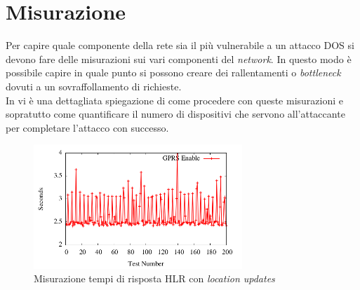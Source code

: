 \clearpage

\section{Misurazione}
Per capire quale componente della rete sia il più vulnerabile a un attacco DOS si devono fare delle misurazioni sui vari componenti del \textit{network}.
In questo modo è possibile capire in quale punto si possono creare dei rallentamenti o \textit{bottleneck} dovuti a un sovraffollamento di richieste.\\
In \cite{measuring-dos} vi è una dettagliata spiegazione di come procedere con queste misurazioni e sopratutto come quantificare il numero di dispositivi che 
servono all'attaccante per completare l'attacco con successo.

\begin{figure}[h]
    \centering
    \includegraphics[width=0.7\textwidth]{images/hlr-measuring.png}
    \caption{Misurazione tempi di risposta HLR con \textit{location updates}\cite{measuring-dos}}
\end{figure}